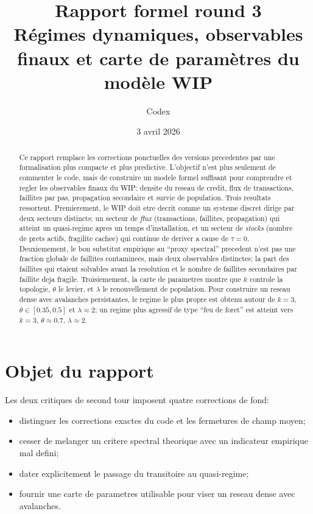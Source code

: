 \documentclass[11pt,a4paper]{article}
\title{Rapport formel round 3\\
\large Régimes dynamiques, observables finaux et carte de paramètres du modèle WIP}
\author{Codex}
\date{3 avril 2026}
\begin{document}
\maketitle

\begin{abstract}
Ce rapport remplace les corrections ponctuelles des versions precedentes par une formalisation plus compacte et plus predictive. L'objectif n'est plus seulement de commenter le code, mais de construire un modele formel suffisant pour comprendre et regler les observables finaux du WIP: densite du reseau de credit, flux de transactions, faillites par pas, propagation secondaire et survie de population. Trois resultats ressortent. Premierement, le WIP doit etre decrit comme un systeme discret dirige par deux secteurs distincts: un secteur de \emph{flux} (transactions, faillites, propagation) qui atteint un quasi-regime apres un temps d'installation, et un secteur de \emph{stocks} (nombre de prets actifs, fragilite cachee) qui continue de deriver a cause de $\tau=0$. Deuxiemement, le bon substitut empirique au ``proxy spectral'' precedent n'est pas une fraction globale de faillites contaminees, mais deux observables distinctes: la part des faillites qui etaient solvables avant la resolution et le nombre de faillites secondaires par faillite deja fragile. Troisiemement, la carte de parametres montre que $k$ controle la topologie, $\theta$ le levier, et $\lambda$ le renouvellement de population. Pour construire un reseau dense avec avalanches persistantes, le regime le plus propre est obtenu autour de $k=3$, $\theta \in [0.35,0.5]$ et $\lambda \approx 2$; un regime plus agressif de type ``feu de foret'' est atteint vers $k=3$, $\theta \approx 0.7$, $\lambda \approx 2$.
\end{abstract}

\section{Objet du rapport}
Les deux critiques de second tour imposent quatre corrections de fond:
\begin{itemize}
\item distinguer les corrections exactes du code et les fermetures de champ moyen;
\item cesser de melanger un critere spectral theorique avec un indicateur empirique mal defini;
\item dater explicitement le passage du transitoire au quasi-regime;
\item fournir une carte de parametres utilisable pour viser un reseau dense avec avalanches.
\end{itemize}
\end{document}
